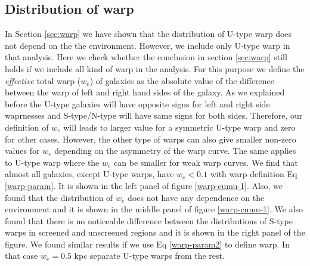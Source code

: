 \documentclass[useAMS,usenatbib,twocolumn]{mn2e}
\begin{document}
\subsection{Distribution of warp}
\label{ap:warp-distri}
In Section \ref{sec:warp} we have shown that the distribution of
U-type warp does not depend on the the environment. However, we include
only U-type warp in that analysis. Here we check whether the conclusion in
 section \ref{sec:warp} still holds if we include all kind of
warp in the analysis. For this purpose we define the \textit{effective}
total warp ($w_e$) of galaxies as the absolute value of the difference
between the warp of left and right hand sides of the galaxy. As we
explained before the U-type galaxies will have opposite signs for left and 
right side waprnesses and S-type/N-type will have same signs for both sides.
Therefore, our definition of $w_e$ will leads to larger value for a symmetric
U-type warp and zero for other cases. However, the other type of warps can also
give smaller non-zero values for $w_e$ depending on the asymmetry of the warp
curve. The same applies to U-type warp where the $w_e$ can be smaller for weak
warp curves. We find that almost all galaxies, except U-type warps, have
$w_e < 0.1$ with warp definition Eq \ref{warp-param}. It is shown in the
left panel of figure \ref{warp-cumu-1}. Also, we found that the distribution of
$w_e$ does not have any dependence on the environment and it is shown in the
middle panel of figure \ref{warp-cumu-1}. We also found that there is no 
noticeable difference between the distributions of S-type warps in screened and
unscreened regions and it is shown in the right panel of the figure. We found
similar results if we use Eq \ref{warp-param2} to define
warp. In that case $w_e = 0.5$ kpc separate U-type warps from the rest. 
\end{document}
